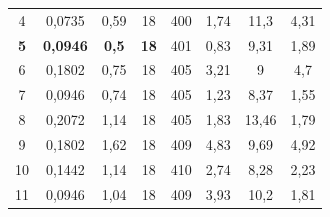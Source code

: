 \documentclass[12pt,a4paper]{article}
\begin{document}
\begin{table}[]
{\begin{tabular}{|c|c|c|c|c|c|c|c|}
    4                        & 0,0735                 & 0,59                       & 18                                         & 400                       & 1,74                                            & 11,3                                     & 4,31                                  \\
    \textbf{5}               & \textbf{0,0946}        & \textbf{0,5}               & \textbf{18}                                & 401                       & 0,83                                            & 9,31                                     & 1,89                                  \\
    6                        & 0,1802                 & 0,75                       & 18                                         & 405                       & 3,21                                            & 9                                        & 4,7                                   \\
    7                        & 0,0946                 & 0,74                       & 18                                         & 405                       & 1,23                                            & 8,37                                     & 1,55                                  \\
    8                        & 0,2072                 & 1,14                       & 18                                         & 405                       & 1,83                                            & 13,46                                    & 1,79                                  \\
    9                        & 0,1802                 & 1,62                       & 18                                         & 409                       & 4,83                                            & 9,69                                     & 4,92                                  \\
    10                       & 0,1442                 & 1,14                       & 18                                         & 410                       & 2,74                                            & 8,28                                     & 2,23                                  \\
    11                       & 0,0946                 & 1,04                       & 18                                         & 409                       & 3,93                                            & 10,2                                     & 1,81                                  \\

\end{tabular}}
\end{table}
\end{document}
